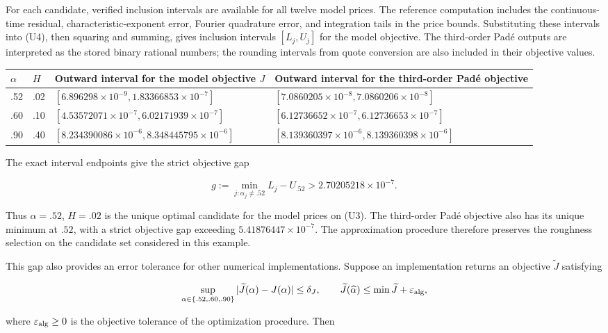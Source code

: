 \documentclass[a4paper,11pt]{article}
\begin{document}
For each candidate, verified inclusion intervals are available for all twelve model prices. The reference computation includes the continuous-time residual, characteristic-exponent error, Fourier quadrature error, and integration tails in the price bounds. Substituting these intervals into (U4), then squaring and summing, gives inclusion intervals $[L_j,U_j]$ for the model objective. The third-order Padé outputs are interpreted as the stored binary rational numbers; the rounding intervals from quote conversion are also included in their objective values.

\begingroup\scriptsize\setlength{\tabcolsep}{3pt}
\begin{longtable}{L{0.222500\textwidth}L{0.222500\textwidth}L{0.222500\textwidth}L{0.222500\textwidth}}
$\alpha$ & $H$ & Outward interval for the model objective $J$ & Outward interval for the third-order Padé objective\\
\hline
.52 & .02 & $[6.896298\times10^{-9},1.83366853\times10^{-7}]$ & $[7.0860205\times10^{-8},7.0860206\times10^{-8}]$\\
.60 & .10 & $[4.53572071\times10^{-7},6.02171939\times10^{-7}]$ & $[6.12736652\times10^{-7},6.12736653\times10^{-7}]$\\
.90 & .40 & $[8.234390086\times10^{-6},8.348445795\times10^{-6}]$ & $[8.139360397\times10^{-6},8.139360398\times10^{-6}]$\\
\end{longtable}\endgroup

The exact interval endpoints give the strict objective gap

\[
g:=\min_{j:\alpha_j\ne.52}L_j-U_{.52}
>2.70205218\times10^{-7}.
\tag{U5}
\]

Thus $\alpha=.52$, $H=.02$ is the unique optimal candidate for the model prices on (U3). The third-order Padé objective also has its unique minimum at $.52$, with a strict objective gap exceeding $5.41876447\times10^{-7}$. The approximation procedure therefore preserves the roughness selection on the candidate set considered in this example.

This gap also provides an error tolerance for other numerical implementations. Suppose an implementation returns an objective $\widetilde J$ satisfying

\[
\sup_{\alpha\in\{.52,.60,.90\}}
|\widetilde J(\alpha)-J(\alpha)|\le\delta_J,
\qquad
\widetilde J(\widehat\alpha)\le\min\widetilde J+\varepsilon_{\rm alg},
\]

where $\varepsilon_{\rm alg}\ge0$ is the objective tolerance of the optimization procedure. Then
\end{document}
